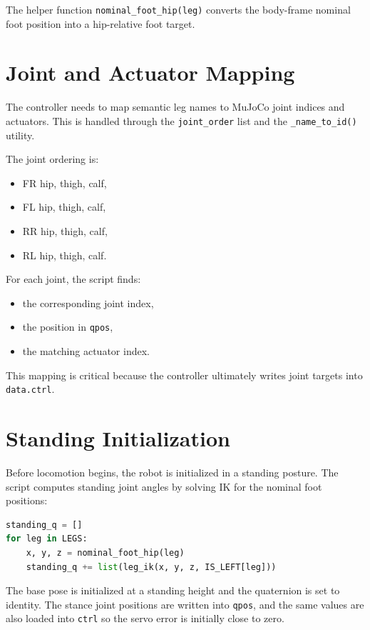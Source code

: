 \documentclass[11pt,a4paper]{report}
\begin{document}
The helper function \texttt{nominal\_foot\_hip(leg)} converts the body-frame nominal foot position into a hip-relative foot target.

\section{Joint and Actuator Mapping}

The controller needs to map semantic leg names to MuJoCo joint indices and actuators. This is handled through the \texttt{joint\_order} list and the \texttt{\_name\_to\_id()} utility.

The joint ordering is:
\begin{itemize}
    \item FR hip, thigh, calf,
    \item FL hip, thigh, calf,
    \item RR hip, thigh, calf,
    \item RL hip, thigh, calf.
\end{itemize}

For each joint, the script finds:
\begin{itemize}
    \item the corresponding joint index,
    \item the position in \texttt{qpos},
    \item the matching actuator index.
\end{itemize}

This mapping is critical because the controller ultimately writes joint targets into \texttt{data.ctrl}.

\section{Standing Initialization}

Before locomotion begins, the robot is initialized in a standing posture. The script computes standing joint angles by solving IK for the nominal foot positions:
\begin{lstlisting}[language=Python]
standing_q = []
for leg in LEGS:
    x, y, z = nominal_foot_hip(leg)
    standing_q += list(leg_ik(x, y, z, IS_LEFT[leg]))
\end{lstlisting}

The base pose is initialized at a standing height and the quaternion is set to identity. The stance joint positions are written into \texttt{qpos}, and the same values are also loaded into \texttt{ctrl} so the servo error is initially close to zero.
\end{document}
